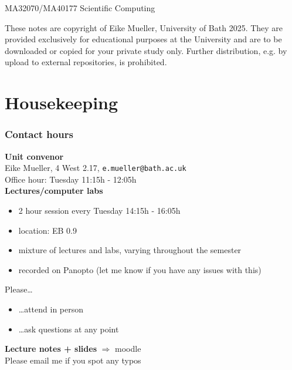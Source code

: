\documentclass{beamer}
\begin{document}
\begin{frame}
  \begin{center}
  \Large{MA32070/MA40177 Scientific Computing}
  \end{center}
  \vfill
  \footnotesize{
  These notes are copyright of Eike Mueller, University of Bath 2025. They are provided exclusively for educational purposes at the University and are to be downloaded or copied for your private study only. Further distribution, e.g. by upload to external repositories, is prohibited.}
\end{frame}

\section{Housekeeping}


\begin{frame}
  \tableofcontents[currentsection]
\end{frame}

\begin{frame}
  \frametitle{Contact hours}
\textbf{Unit convenor}\\
  Eike Mueller, 4 West 2.17, \texttt{e.mueller@bath.ac.uk}\\
  Office hour: Tuesday 11:15h - 12:05h\\[2ex]
\textbf{Lectures/computer labs}

\begin{itemize} 
  \item 2 hour session every Tuesday 14:15h - 16:05h
  \item location: EB 0.9
  \item mixture of lectures and labs, varying throughout the semester
  \item recorded on Panopto {\footnotesize (let me know if you have any issues with this)}
\end{itemize}

Please\dots
\begin{itemize}
  \item \dots attend in person
  \item \dots ask questions at any point
\end{itemize}

\textbf{Lecture notes + slides} $\Rightarrow$ moodle\\[1ex]
Please email me if you spot any typos
\end{frame}
\end{document}
